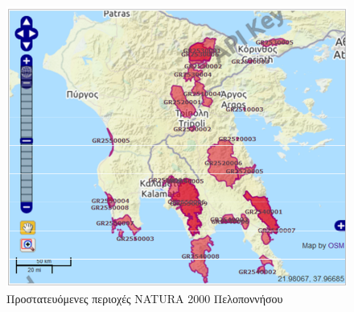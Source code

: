 \documentclass[12pt]{article}
\begin{document}
	\begin{figure} [H]
		\begin{center}
			\includegraphics [scale = 0.60] {protected.png}
			\caption{Προστατευόμενες περιοχές NATURA 2000 Πελοποννήσου}
		\end{center}
	\end{figure}
\end{document}
